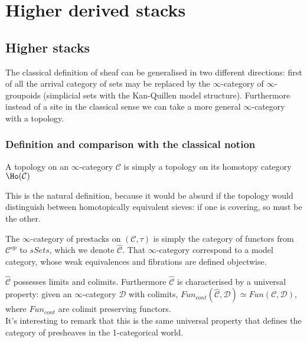 \chapter{Higher derived stacks}

\section{Higher stacks}

The classical definition of sheaf can be generalised in two different directions: first of all the arrival category of sets may be replaced by the 
$\infty$-category of $\infty$-groupoids (simplicial sets with the Kan-Quillen model structure). Furthermore instead of a site in the classical sense we can 
take a more general $\infty$-category with a topology.\\
\subsection{Definition and comparison with the classical notion}
\begin{defin}
A topology on an $\infty$-category $\mathcal C$ is simply a topology on its homotopy category $\Ho(\mathcal C)$
\end{defin}

\begin{rmk}
This is the natural definition, because it would be absurd if the topology would distinguish between homotopically equivalent sieves: if one is covering, so must be the other.
\end{rmk}


The $\infty$-category of prestacks on $(\mathcal C,\tau)$ is simply the category of functors from $\mathcal C^{op}$ to $sSets$, which we denote $\hat{\mathcal C}$.
That $\infty$-category correspond to a model category, whose weak equivalences and fibrations are defined objectwise.\\

\begin{rmk} $\hat{\mathcal C}$ possesses limits and colimits. Furthermore
$\hat{\mathcal C}$ is characterised by a universal property: given an $\infty$-category $\mathcal D$ with colimits, $Fun_{cont}(\hat{\mathcal C}, \mathcal D)\simeq Fun(\mathcal C,\mathcal D)$, where
$Fun_{cont}$ are colimit preserving functors.\\
It's interesting to remark that this is the same universal property that defines the category of presheaves in the 1-categorical world.
\end{rmk}

